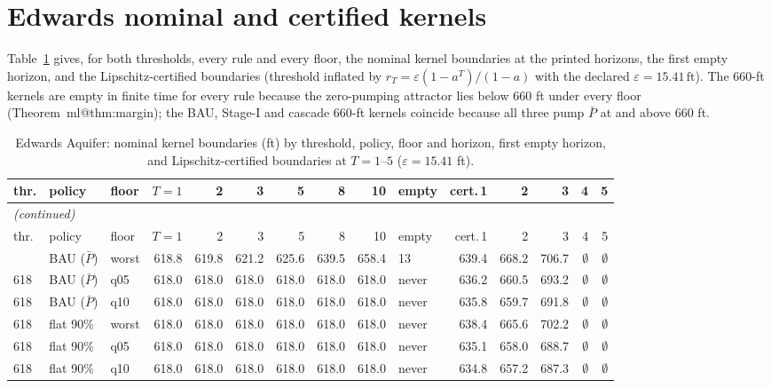 \documentclass[11pt,a4paper]{article}
\makeatletter
\newcommand{\Pbar}{\bar P}
\newcommand{\ft}{\,\mathrm{ft}}
\newcommand{\mref}[1]{\csname ml@#1\endcsname}
\makeatother
\begin{document}
\section{Edwards nominal and certified kernels}\label{si:edw-kernels}
Table~\ref{tab:si-edw-kernels} gives, for both thresholds, every rule and every floor, the nominal kernel boundaries at the printed horizons, the first empty horizon, and the Lipschitz-certified boundaries (threshold inflated by $r_T=\varepsilon(1-a^T)/(1-a)$ with the declared $\varepsilon=15.41\ft$). The 660-ft kernels are empty in finite time for every rule because the zero-pumping attractor lies below 660 ft under every floor (Theorem~\mref{thm:margin}); the BAU, Stage-I and cascade 660-ft kernels coincide because all three pump $\Pbar$ at and above 660 ft.
\begingroup\scriptsize\setlength{\tabcolsep}{2.5pt}
\begin{longtable}{lllrrrrrrlrrrrr}
\caption{Edwards Aquifer: nominal kernel boundaries (ft) by threshold, policy, floor and horizon, first empty horizon, and Lipschitz-certified boundaries at $T=1$--$5$ ($\varepsilon=15.41$ ft).}\label{tab:si-edw-kernels}\\
\toprule
thr. & policy & floor & $T{=}1$ & 2 & 3 & 5 & 8 & 10 & empty & cert.\,1 & 2 & 3 & 4 & 5 \\
\midrule
\endfirsthead
\multicolumn{15}{l}{\emph{(continued)}}\\
\toprule
thr. & policy & floor & $T{=}1$ & 2 & 3 & 5 & 8 & 10 & empty & cert.\,1 & 2 & 3 & 4 & 5 \\
\midrule
\endhead
\bottomrule
\endfoot
618 & BAU ($\bar P$) & worst & 618.8 & 619.8 & 621.2 & 625.6 & 639.5 & 658.4 & 13 & 639.4 & 668.2 & 706.7 & $\emptyset$ & $\emptyset$ \\
618 & BAU ($\bar P$) & q05 & 618.0 & 618.0 & 618.0 & 618.0 & 618.0 & 618.0 & never & 636.2 & 660.5 & 693.2 & $\emptyset$ & $\emptyset$ \\
618 & BAU ($\bar P$) & q10 & 618.0 & 618.0 & 618.0 & 618.0 & 618.0 & 618.0 & never & 635.8 & 659.7 & 691.8 & $\emptyset$ & $\emptyset$ \\
618 & flat 90\% & worst & 618.0 & 618.0 & 618.0 & 618.0 & 618.0 & 618.0 & never & 638.4 & 665.6 & 702.2 & $\emptyset$ & $\emptyset$ \\
618 & flat 90\% & q05 & 618.0 & 618.0 & 618.0 & 618.0 & 618.0 & 618.0 & never & 635.1 & 658.0 & 688.7 & $\emptyset$ & $\emptyset$ \\
618 & flat 90\% & q10 & 618.0 & 618.0 & 618.0 & 618.0 & 618.0 & 618.0 & never & 634.8 & 657.2 & 687.3 & $\emptyset$ & $\emptyset$ \\

\end{longtable}
\end{document}
